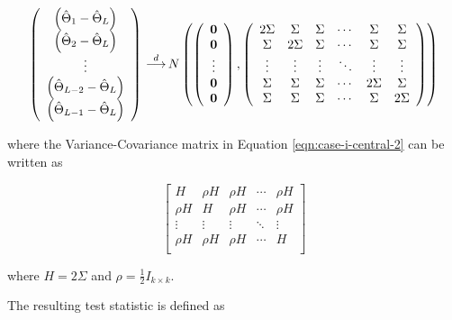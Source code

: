 \documentclass[useAMS]{cJAS2e}
\def\indist{\,{\buildrel d \over \longrightarrow}\,}
\begin{document}
\begin{equation}\label{eqn:case-i-central-2}
	\left(
		\begin{array}{c}
			\left(\hat{\Theta}_1 - \hat{\Theta}_L \right) \\
			\left(\hat{\Theta}_2 - \hat{\Theta}_L  \right) \\
			\vdots \\
			\left(\hat{\Theta}_{L-2} - \hat{\Theta}_L \right) \\
			\left(\hat{\Theta}_{L-1} - \hat{\Theta}_L  \right)
		\end{array}
	\right)  \indist N
	\left(	\left(
		\begin{array}{c}
			\mathbf{0} \\
			\mathbf{0} \\
			\vdots \\
			\mathbf{0} \\
			\mathbf{0}
		\end{array}
		\right),
		\left(
		\begin{array}{cccccc}
			2\Sigma & \Sigma & \Sigma & \cdots & \Sigma & \Sigma \\
			\Sigma & 2\Sigma & \Sigma & \cdots & \Sigma & \Sigma \\
			\vdots & \vdots & \vdots & \ddots & \vdots & \vdots \\
			\Sigma & \Sigma & \Sigma & \cdots & 2\Sigma & \Sigma \\
			\Sigma & \Sigma & \Sigma & \cdots & \Sigma & 2\Sigma
		\end{array}
		\right)
	\right)
\end{equation}

\noindent where the Variance-Covariance matrix in Equation \eqref{eqn:case-i-central-2} can be written as


\begin{equation}\label{eqn:case-i-cov}
	\left[ \begin{array}{ccccc}H & \rho H & \rho H & \cdots & \rho H \\ \rho H &H & \rho H & \cdots & \rho H \\ \vdots & \vdots & \vdots & \ddots & \vdots \\ \rho H & \rho H & \rho H & \cdots &H \\\end{array}\right]
\end{equation}

\noindent where $H = 2 \Sigma$ and $\rho = \frac{1}{2} I_{k \times k}$.

\noindent The resulting test statistic is defined as
\end{document}
